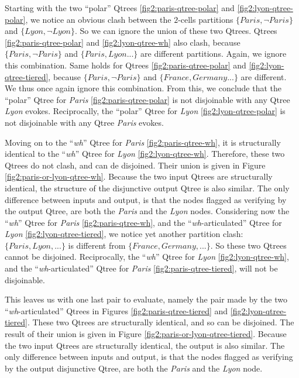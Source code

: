 Starting with the two ``polar'' Qtrees \ref{fig2:paris-qtree-polar} and \ref{fig2:lyon-qtree-polar}, we notice an obvious clash between the $2$-cells partitions $\lbrace \textit{Paris}, \neg\textit{Paris}\rbrace$ and $\lbrace \textit{Lyon}, \neg\textit{Lyon}\rbrace$. So we can ignore the union of these two Qtrees. Qtrees \ref{fig2:paris-qtree-polar} and \ref{fig2:lyon-qtree-wh} also clash, because $\lbrace \textit{Paris}, \neg\textit{Paris}\rbrace$ and $\lbrace \textit{Paris}, \textit{Lyon} ...\rbrace$ are different partitions. Again, we ignore this combination. Same holds for Qtrees \ref{fig2:paris-qtree-polar} and \ref{fig2:lyon-qtree-tiered}, because $\lbrace \textit{Paris}, \neg\textit{Paris}\rbrace$ and $\lbrace \textit{France}, \textit{Germany} ...\rbrace$ are different. We thus once again ignore this combination. From this, we conclude that the ``polar'' Qtree  for \textit{Paris} \ref{fig2:paris-qtree-polar} is not disjoinable with any Qtree \textit{Lyon} evokes. Reciprocally, the ``polar'' Qtree  for \textit{Lyon} \ref{fig2:lyon-qtree-polar} is not disjoinable with any Qtree \textit{Paris} evokes. 

Moving on to the ``\textit{wh}'' Qtree for \textit{Paris} \ref{fig2:paris-qtree-wh}, it is structurally identical to the ``\textit{wh}'' Qtree for \textit{Lyon} \ref{fig2:lyon-qtree-wh}. Therefore, these two Qtrees do not clash, and can de disjoined. Their union is given in Figure \ref{fig2:paris-or-lyon-qtree-wh}. Because the two input Qtrees are structurally identical, the structure of the disjunctive output Qtree is also similar. The only difference between inputs and output, is that the nodes flagged as verifying by the output Qtree, are both the \textit{Paris} and the \textit{Lyon} nodes. Considering now the ``\textit{wh}'' Qtree for \textit{Paris} \ref{fig2:paris-qtree-wh}, and the ``\textit{wh}-articulated'' Qtree for \textit{Lyon} \ref{fig2:lyon-qtree-tiered}, we notice yet another partition clash: $\lbrace \textit{Paris}, \textit{Lyon}, ...\rbrace$ is different from $\lbrace\textit{France}, \textit{Germany}, ... \rbrace$. So these two Qtrees cannot be disjoined. Reciprocally, the ``\textit{wh}'' Qtree for \textit{Lyon} \ref{fig2:lyon-qtree-wh}, and the ``\textit{wh}-articulated'' Qtree for \textit{Paris} \ref{fig2:paris-qtree-tiered}, will not be disjoinable.

This leaves us with one last pair to evaluate, namely the pair made by the two ``\textit{wh}-articulated'' Qtrees in Figures \ref{fig2:paris-qtree-tiered} and \ref{fig2:lyon-qtree-tiered}. These two Qtrees are structurally identical, and so can be disjoined. The result of their union is given in Figure \ref{fig2:paris-or-lyon-qtree-tiered}. Because the two input Qtrees are structurally identical, the output is also similar. The only difference between inputs and output, is that the nodes flagged as verifying by the output disjunctive Qtree, are both the \textit{Paris} and the \textit{Lyon} node.

